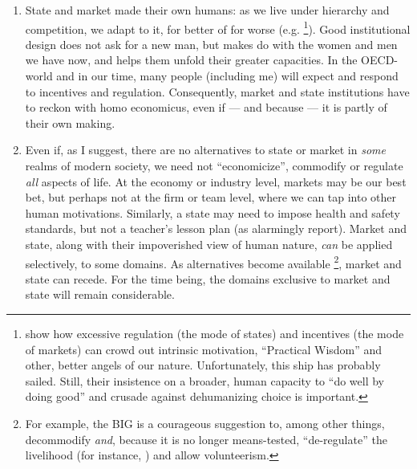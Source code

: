 \documentclass[11pt,a4paper,oneside,openright]{article}
\begin{document}
\begin{enumerate}
\begin{enumerate}
		\item State and market made their own humans: 
		as we live under hierarchy and competition, we adapt to it, for better of for worse (e.g. \citealt{Schwartz2010}
			\footnote{
				\cite{Schwartz2010} show how excessive regulation (the mode of states) and incentives (the mode of markets) can crowd out intrinsic motivation, ``Practical Wisdom'' and other, better angels of our nature. 
				Unfortunately, this ship has probably sailed. Still, their insistence on a broader, human capacity to ``do well by doing good'' and crusade against dehumanizing choice is important.}). 
		Good institutional design does not ask for a new man, but makes do with the women and men we have now, and helps them unfold their greater capacities. 
		In the \gls{OECD}-world and in our time, many people (including me) will expect and respond to incentives and regulation. 
		Consequently, market and state institutions have to reckon with homo economicus, even if --- and because --- it is partly of their own making.
		
		\item Even if, as I suggest, there are no alternatives to state or market in \emph{some} realms of modern society, we need not ``economicize'', commodify or regulate \emph{all} aspects of life. 
		At the economy or industry level, markets may be our best bet, but perhaps not at the firm or team level, where we can tap into other human motivations. 
		Similarly, a state may need to impose health and safety standards, but not a teacher's lesson plan (as \citeauthor{Schwartz2010} alarmingly report). 
		Market and state, along with their impoverished view of human nature, \emph{can} be applied selectively, to some domains. 
		As alternatives become available
			\footnote{
				For example, the \gls{BIG} is a courageous suggestion to, among other things, decommodify \emph{and}, because it is no longer means-tested, ``de-regulate'' the livelihood (for instance, \citealt{Offe2009}) and allow volunteerism.
			}, 
		market and state can recede. 
		For the time being, the domains exclusive to market and state will remain considerable. 
		

\end{enumerate}
\end{enumerate}
\end{document}
